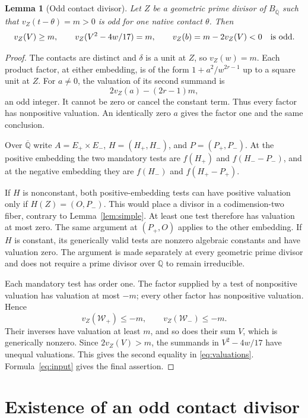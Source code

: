 \documentclass[11pt,a4paper]{article}
\newtheorem{lemma}[theorem]{Lemma}
\theoremstyle{remark}\newtheorem{remark}[theorem]{Remark}
\newcommand{\Q}{\mathbb Q}\newcommand{\Qbar}{\overline{\mathbb Q}}
\begin{document}
\begin{lemma}[Odd contact divisor]\label{lem:contact}
Let $Z$ be a geometric prime divisor of $B_{\Qbar}$ such that
$v_Z(t-\theta)=m>0$ is odd for one native contact $\theta$.
Then
\begin{equation}\label{eq:valuations}
 v_Z(V)\ge m,\qquad
 v_Z(V^2-4w/17)=m,\qquad
 v_Z(b)=m-2v_Z(V)<0\quad\hbox{is odd}.
\end{equation}
\end{lemma}
\begin{proof}
The contacts are distinct and $\delta$ is a unit at $Z$, so
$v_Z(w)=m$. Each product factor, at either embedding, is of the
form $1+a^2/w^{2r-1}$ up to a square unit at $Z$. For $a\ne0$,
the valuation of its second summand is
\[
                         2v_Z(a)-(2r-1)m,
\]
an odd integer. It cannot be zero or cancel the constant term.
Thus every factor has nonpositive valuation. An identically zero
$a$ gives the factor one and the same conclusion.

Over $\Qbar$ write $A=E_+\times E_-$, $H=(H_+,H_-)$,
and $P=(P_+,P_-)$. At the positive embedding the two mandatory
tests are $f(H_+)$ and $f(H_--P_-)$, and at the negative embedding
they are $f(H_-)$ and $f(H_+-P_+)$.

If $H$ is nonconstant, both positive-embedding tests can have
positive valuation only if $H(Z)=(O,P_-)$. This would place a
divisor in a codimension-two fiber, contrary to
Lemma~\ref{lem:simple}. At least one test therefore has valuation
at most zero. The same argument at $(P_+,O)$ applies to the other
embedding. If $H$ is constant, its generically valid tests are
nonzero algebraic constants and have valuation zero. The argument
is made separately at every geometric prime divisor and does not
require a prime divisor over $\Q$ to remain irreducible.

Each mandatory test has order one. The factor supplied by a test
of nonpositive valuation has valuation at most $-m$; every other
factor has nonpositive valuation. Hence
\[
                 v_Z(\mathcal W_+)\le-m,\qquad
                 v_Z(\mathcal W_-)\le-m.
\]
Their inverses have valuation at least $m$, and so does their sum
$V$, which is generically nonzero. Since $2v_Z(V)>m$, the
summands in $V^2-4w/17$ have unequal valuations. This gives the
second equality in \eqref{eq:valuations}. Formula~\eqref{eq:input}
gives the final assertion.
\end{proof}

\section{Existence of an odd contact divisor}
\end{document}
